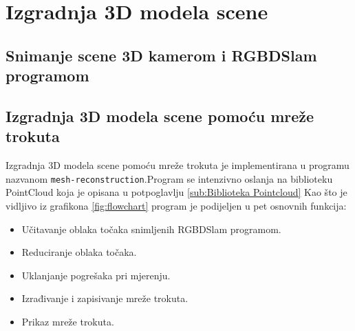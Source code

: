 \newpage
\setcounter{figure}{0}

\section{Izgradnja 3D modela scene} %
\label{sec:Izgradnja 3D modela scene}

\subsection{Snimanje scene 3D kamerom i RGBDSlam programom} %
\label{sub:Snimanje scene 3D kamerom i RGBDSlam programom}


\newpage
\subsection{Izgradnja 3D modela scene pomoću mreže trokuta} %
\label{sub:Izgradnja 3D modela scene pomoću mreže trokuta}

Izgradnja 3D modela scene pomoću mreže trokuta je implementirana u
programu nazvanom \texttt{mesh-reconstruction}.\footnotemark[1]
Program se intenzivno oslanja na biblioteku PointCloud koja je opisana u
potpoglavlju \ref{sub:Biblioteka Pointcloud} Kao što je vidljivo iz
grafikona \ref{fig:flowchart} program je podijeljen u pet osnovnih
funkcija:
\begin{itemize}
    \item Učitavanje oblaka točaka snimljenih RGBDSlam programom.
    \item Reduciranje oblaka točaka.
    \item Uklanjanje pogrešaka pri mjerenju.
    \item Izrađivanje i zapisivanje mreže trokuta.
    \item Prikaz mreže trokuta.
\end{itemize}



